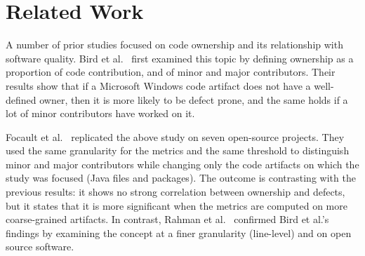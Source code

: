 

\section{Related Work}
\label{sec:rel}

A number of prior studies focused on code ownership and its relationship with software quality. Bird et al.~\cite{bird:original} first examined this topic by defining ownership as a proportion of code contribution, and of minor and major contributors. Their results show that if a Microsoft Windows code artifact does not have a well-defined owner, then it is more likely to be defect prone, and the same holds if a lot of minor contributors have worked on it. 

Focault et al.~\cite{Foucault:oss} replicated the above study on seven open-source projects. They used the same granularity for the metrics and the same threshold to distinguish minor and major contributors while changing only the code artifacts on which the study was focused (Java files and packages). The outcome is contrasting with the previous results: it shows no strong correlation between ownership and defects, but it states that it is more significant when the metrics are computed on more coarse-grained artifacts. In contrast, Rahman et al.~\cite{Rahman:blame} confirmed Bird et al.'s findings by examining the concept at a finer granularity (line-level) and on open source software. 




